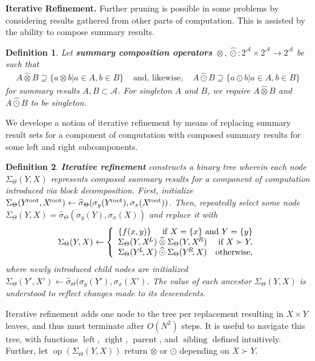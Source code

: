 \documentclass{article}
\newtheorem{definition} {Definition}
\newcommand{\killspace}{\vspace{-0.08in}}
\newcommand{\GNP}[1][\psi]{{#1}_{\Theta}}
\newcommand{\sigmahat}{\mathbin{\widehat{\sigma}}}
\newcommand{\otimeshat}{\mathbin{\widehat{\otimes}}}
\newcommand{\odothat}{\mathbin{\widehat{\odot}}}
\DeclareMathOperator{\leftchild}{left}
\DeclareMathOperator{\rightchild}{right}
\DeclareMathOperator{\parent}{parent}
\DeclareMathOperator{\sibling}{sibling}
\DeclareMathOperator{\op}{op}
\newcommand{\kdroot}[1]{#1^{\!\text{\rm root}}}
\newcommand{\kdleft}[1]{#1^{\!L}}
\newcommand{\kdright}[1]{#1^{\!R}}
\begin{document}
{\bf Iterative Refinement.}  Further pruning is possible in some
problems by considering results gathered from other parts of
computation.  This is assisted by the ability to compose summary
results.
\begin{definition}
  Let {\bf summary composition operators} $\otimeshat, \odothat \colon
  2^{\mathcal{A}} \times 2^{\mathcal{A}} \to 2^{\mathcal{A}}$ be such
  that
  \[ \begin{array}{rcl}
    A \otimeshat B \supseteq \{a \otimes b | a \in A, b \in B\} & \mbox{ and, likewise, } & A \odothat B \supseteq \{a \odot b | a \in A, b \in B\}
  \end{array} \]
  for summary results $A,B \subset \mathcal{A}$.  For singleton $A$
  and $B$, we require $A \otimeshat B$ and $A \odothat B$ to be
  singleton.
\end{definition}
\killspace
\noindent We develope a notion of iterative refinement by means of
replacing summary result sets for a component of
computation with composed summary results for some left and right
subcomponents.
\begin{definition}
  {\bf Iterative refinement} constructs a binary tree wherein each
  node $\GNP[\Sigma](Y,X)$ represents composed summary results for a
  component of computation introduced via block decomposition.  First,
  initialize $\GNP[\Sigma](\kdroot{Y},\kdroot{X}) \gets
  \GNP[\sigmahat](\sigma_y(\kdroot{Y}),\sigma_x(\kdroot{X}))$.  Then,
  repeatedly select some node $\GNP[\Sigma](Y,X) =
  \GNP[\sigmahat](\sigma_y(Y),\sigma_x(X))$ and replace it with
  \[
  \GNP[\Sigma](Y,X) \gets \left\{ \begin{array}{lrr}
    \{f(x,y)\} & \multicolumn{2}{r}{\mbox{\rm if } X = \{x\} \mbox{ \rm and } Y = \{y\}} \\
    \multicolumn{2}{l}{\GNP[\Sigma](Y,\kdleft{X}) \otimeshat \GNP[\Sigma](Y,\kdright{X})} & \mbox{\rm if } X \succ Y, \\
    \multicolumn{2}{l}{\GNP[\Sigma](\kdleft{Y}\!,X) \odothat \GNP[\Sigma](\kdright{Y}\!,X)} & \mbox{\rm otherwise},
  \end{array} \right.
  \]
  where newly introduced child nodes are initialized
  $\GNP[\Sigma](Y',X') \gets \GNP[\sigmahat](\sigma_y(Y'),\sigma_x(X')$.
  The value of each ancestor $\GNP[\Sigma](Y,X)$ is understood to
  reflect changes made to its descendents.
\end{definition}
\killspace
\noindent Iterative refinement adds one node to the tree per replacement resulting in $X \times Y$ leaves, and thus must terminate after $O(N^2)$ steps.
It is useful to navigate this tree, with functions $\leftchild$, $\rightchild$, $\parent$, and $\sibling$ defined intuitively.
Further, let $\op(\GNP[\Sigma](Y,X))$ return $\otimes$ or $\odot$ depending on $X \succ Y$.
\end{document}
